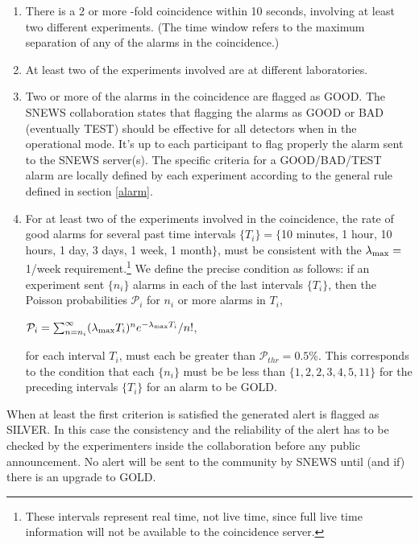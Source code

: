 \documentclass{article}
\begin{document}
\begin{enumerate}

\item There is a 2 or more -fold coincidence within 10 seconds,
involving at least two different experiments. 
(The time window refers to the maximum
separation of any of the alarms in the coincidence.)

\item At least two of the experiments involved
are at different laboratories.

\item Two or more of the alarms in the coincidence
are flagged as GOOD.  The SNEWS collaboration states
that flagging the alarms as GOOD or BAD (eventually TEST) should be effective 
for all detectors when in the operational  mode.  
It's up to each participant to flag properly the alarm sent to the SNEWS 
server(s). 
The specific criteria for a GOOD/BAD/TEST alarm are locally defined by
each experiment according to the general rule defined in section \ref{alarm}. 
  
 \item For at least two of the experiments involved in the coincidence,
the rate of good alarms for several past time intervals $\{T_i\}=\{$10 minutes, 1
hour, 10 hours, 1 day, 3 days, 1 week, 1 month$\}$, must be consistent with
the $\lambda_{\rm{max}}=$1/week requirement.\footnote{These intervals
represent real time, not live time, since full live time information
will not be available to the coincidence server.}
We define the precise condition 
as follows:  
if an experiment sent $\{n_i\}$ alarms in 
each of the last intervals $\{T_i\}$,
then the Poisson probabilities $\mathcal{P}_i$ for $n_i$ or more
alarms in $T_i$,

$\mathcal{P}_i=\sum_{n=n_i}^{\infty}(\lambda_{\rm{max}} T_i)^{n}e^{-\lambda_{\rm{max}} T_i}/n!$,

for each interval $T_i$, must each be greater than $\mathcal{P}_{thr}=0.5$\%.
This corresponds to the condition that each $\{n_i\}$ must be be less
than $\{1,2,2,3,4,5,11\}$ for the preceding intervals $\{T_i\}$ for an
alarm to be GOLD.

\end{enumerate}

When at least the first criterion is satisfied the generated alert is
flagged as SILVER. In this case the consistency and the reliability of
the alert has to be checked by the experimenters inside the
collaboration before any public announcement. No alert will be sent to
the community by SNEWS until (and if) there is an upgrade to GOLD.
\end{document}
